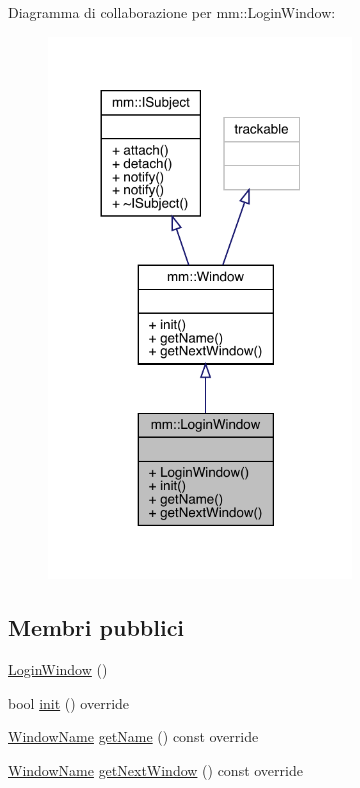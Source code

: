 Diagramma di collaborazione per mm\+:\+:Login\+Window\+:\nopagebreak
\begin{figure}[H]
\begin{center}
\leavevmode
\includegraphics[width=228pt]{d7/de2/classmm_1_1_login_window__coll__graph}
\end{center}
\end{figure}
\subsection*{Membri pubblici}
\begin{DoxyCompactItemize}
\item 
\hyperlink{classmm_1_1_login_window_ad27cc1365af4fec51bd7afb1a9d49cf5}{Login\+Window} ()
\item 
bool \hyperlink{classmm_1_1_login_window_a4040d7c1f85fc76e1f60ef13f92bef1c}{init} () override
\item 
\hyperlink{namespacemm_a4e9d92e04f65dbf2fc1963947da0d93c}{Window\+Name} \hyperlink{classmm_1_1_login_window_aa0597e725bfb2df984f526112080aaf7}{get\+Name} () const override
\item 
\hyperlink{namespacemm_a4e9d92e04f65dbf2fc1963947da0d93c}{Window\+Name} \hyperlink{classmm_1_1_login_window_a399eb7e1a310016ff83b7aa6a9d69722}{get\+Next\+Window} () const override
\end{DoxyCompactItemize}


